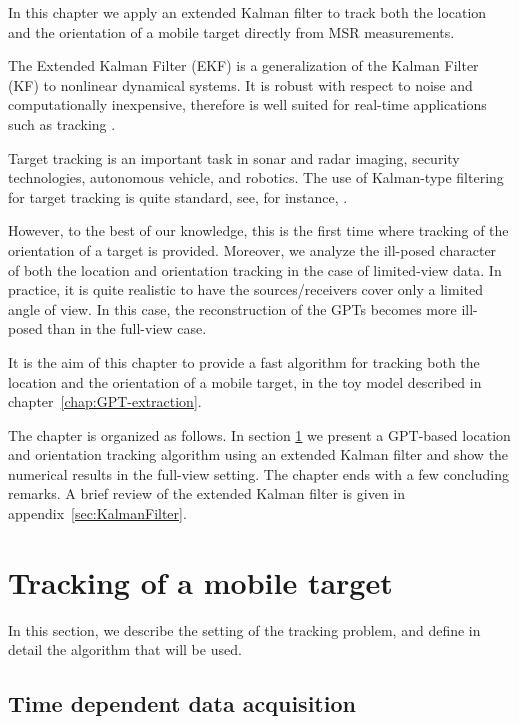 In this chapter we apply an extended Kalman filter to track both the
location and the orientation of a mobile target directly from MSR
measurements.

The Extended Kalman Filter (EKF) is a generalization of the Kalman
Filter (KF) to nonlinear  dynamical systems. It is robust with
respect to noise and computationally inexpensive, therefore is
well suited for real-time applications such as tracking
\cite{kalman2}.

Target tracking is an important task in sonar and radar imaging,
security technologies,  autonomous vehicle, and robotics. The
use of Kalman-type filtering for target tracking is quite
standard, see, for instance,
\cite{track1,track2,track3,track4,track5, track6}.

However, to the best of our knowledge, this is the first time
where tracking of the orientation of a target is provided.
Moreover, we analyze the ill-posed character of both the location
and orientation tracking in the case of limited-view data. In
practice, it is quite realistic to have the sources/receivers
cover only a limited angle of view. In this case, the
reconstruction of the GPTs becomes more ill-posed than in the
full-view case.


It is the aim of this chapter to provide a fast algorithm for
tracking both the location and the orientation of a mobile target, in the
toy model described in chapter~\ref{chap:GPT-extraction}.

The chapter is organized as follows. In
section \ref{sec:tracking_of_mobile_target} we present a GPT-based
location and orientation tracking algorithm using an extended
Kalman filter and show the numerical results in the full-view
setting. The chapter
ends with a few concluding remarks. A brief review of the extended
Kalman filter is given in appendix~\ref{sec:KalmanFilter}.

\newcommand{\bMD}{\bM_D}

\section{Tracking of a mobile target}
\label{sec:tracking_of_mobile_target}

In this section, we describe the setting of the tracking problem, and define
in detail the algorithm that will be used.

\subsection{Time dependent data acquisition}

